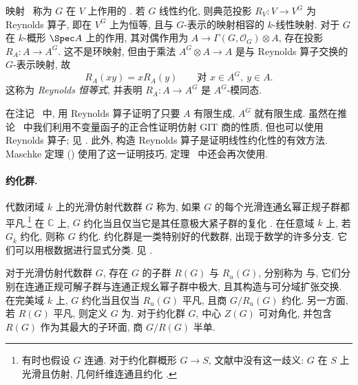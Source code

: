 \begin{remark}[Reynolds 算子]\label{src:B.1.45}
映射~ 称为 $G$ 在 $V$ 上作用的 . 若 $G$ 线性约化, 则典范投影 $R_V:V\to V^G$ 为 Reynolds 算子, 即在 $V^G$ 上为恒等, 且与 $G$-表示的映射相容的 $k$-线性映射. 对于 $G$ 在 $k$-概形 $\Spec A$ 上的作用, 其对偶作用为 $A\to\Gamma(G,\mathcal O_G)\otimes A$, 存在投影 $R_A:A\to A^G$. 这不是环映射, 但由于乘法 $A^G\otimes A\to A$ 是与 Reynolds 算子交换的 $G$-表示映射, 故
\[
R_A(xy)=xR_A(y)\qquad\text{对 }x\in A^G,\ y\in A.
\]
这称为 \textit{Reynolds 恒等式}, 并表明 $R_A:A\to A^G$ 是 $A^G$-模同态.

在注记~ 中, 用 Reynolds 算子证明了只要 $A$ 有限生成, $A^G$ 就有限生成. 虽然在推论~ 中我们利用不变量函子的正合性证明仿射 GIT 商的性质, 但也可以使用 Reynolds 算子; 见 \cite[\S$1.2$]{GIT}. 此外, 构造 Reynolds 算子是证明线性约化性的有效方法. Maschke 定理 () 使用了这一证明技巧, 定理~ 中还会再次使用.
\end{remark}

\paragraph{约化群.}
代数闭域 $k$ 上的光滑仿射代数群 $G$ 称为, 如果 $G$ 的每个光滑连通幺幂正规子群都平凡.\footnote{有时也假设 $G$ 连通. 对于约化群概形 $G\to S$, 文献中没有这一歧义: $G$ 在 $S$ 上光滑且仿射, 几何纤维连通且约化 \cite[Exp. XIX, 定义 $2.7$]{SGA3III}.} 在 $\mathbb C$ 上, $G$ 约化当且仅当它是其任意极大紧子群的复化 \cite[XVII.$5$]{Hoc65}. 在任意域 $k$ 上, 若 $G_{\overline k}$ 约化, 则称 $G$ 约化. 约化群是一类特别好的代数群, 出现于数学的许多分支. 它们可以用根数据进行显式分类. 见 \cite{Bor91,Hum75,Spr98,Mil17}.

对于光滑仿射代数群 $G$, 存在 $G$ 的子群 $R(G)$ 与 $R_u(G)$, 分别称为 与, 它们分别在连通正规可解子群与连通正规幺幂子群中极大, 且其构造与可分域扩张交换. 在完美域 $k$ 上, $G$ 约化当且仅当 $R_u(G)$ 平凡, 且商 $G/R_u(G)$ 约化. 另一方面, 若 $R(G)$ 平凡, 则定义 $G$ 为. 对于约化群 $G$, 中心 $Z(G)$ 可对角化, 并包含 $R(G)$ 作为其最大的子环面, 商 $G/R(G)$ 半单.

